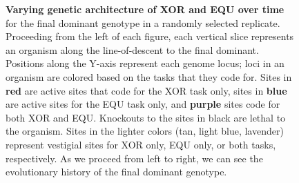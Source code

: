 \documentclass[10pt,letterpaper]{article}
\begin{document}
\begin{figure}[!h]
\setlength{\fboxsep}{0pt}%
\setlength{\fboxrule}{0pt}%
\caption{{\bf Varying genetic architecture of XOR and EQU over time} for the final dominant genotype in a randomly selected replicate. Proceeding from the left of each figure, each vertical slice represents an organism along the line-of-descent to the final dominant.
Positions along the Y-axis represent each genome locus; loci in an organism are colored based on the tasks that they code for. Sites in \textbf{red} are active sites that code for the XOR task only, sites in \textbf{blue} are active sites for the EQU task only, and \textbf{purple} sites code for both XOR and EQU. Knockouts to the sites in black are lethal to the organism. Sites in the lighter colors (tan, light blue, lavender) represent vestigial sites for XOR only, EQU only, or both tasks, respectively. As we proceed from left to right, we can see the evolutionary history of the final dominant genotype.}
\label{fig:lineage}
\end{figure}
\end{document}
